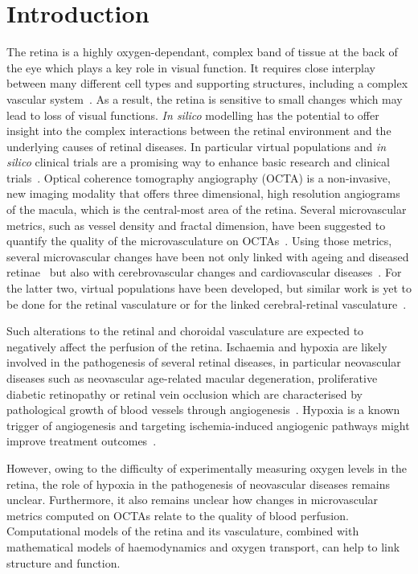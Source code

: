 \documentclass[11pt,]{article}
\begin{document}
\section{Introduction}\label{introduction}

The retina is a highly oxygen-dependant, complex band of tissue at the back of the eye which plays a key role in visual function.
It requires close interplay between many different cell types and supporting structures, including a complex vascular system~\cite{Hernandez2023}.
As a result, the retina is sensitive to small changes which may lead to loss of visual functions.
\textit{In silico} modelling has the potential to offer insight into the complex interactions between the retinal environment and the underlying causes of retinal diseases.
In particular virtual populations and \textit{in silico} clinical trials are a promising way to enhance basic research and clinical trials~\cite{Hernandez2023}.
Optical coherence tomography angiography (OCTA) is a non-invasive, new imaging modality that offers three dimensional, high resolution angiograms of the macula, which is the central-most area of the retina.
Several microvascular metrics, such as vessel density and fractal dimension, have been suggested to quantify the quality of the microvasculature on OCTAs~\cite{Chu2016}.
Using those metrics, several microvascular changes have been not only linked with ageing and diseased retinae~\cite{Ma2021,Trinh_2019, Told2023} but also with cerebrovascular changes and cardiovascular diseases~\cite{Pleouras_2021,Graff_2021,LopezCuenca_2022}.
For the latter two, virtual populations have been developed, but similar work is yet to be done for the retinal vasculature or for the linked cerebral-retinal vasculature~\cite{Hernandez2023}.

Such alterations to the retinal and choroidal vasculature are expected to negatively affect the perfusion of the retina.
Ischaemia and hypoxia are likely involved in the pathogenesis of several retinal diseases, in
particular neovascular diseases such as neovascular age-related
macular degeneration, proliferative diabetic retinopathy or retinal
vein occlusion which are characterised by pathological growth of blood
vessels through angiogenesis~\cite{Medina_2016}.
Hypoxia is a known trigger of angiogenesis and targeting ischemia-induced angiogenic pathways might improve treatment outcomes~\cite{UsuiOuchi2020}.

However, owing to the difficulty of experimentally measuring oxygen
levels in the retina, the role of hypoxia in the pathogenesis of
neovascular diseases remains unclear. Furthermore, it also remains unclear
how changes in microvascular metrics computed on OCTAs relate to the
quality of blood perfusion. Computational models of the retina and its
vasculature, combined with mathematical models of haemodynamics and
oxygen transport, can help to link structure and function.
\end{document}
